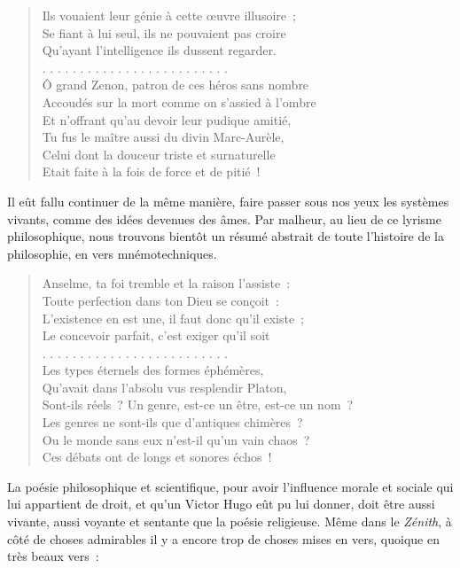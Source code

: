 \documentclass[french,twoside]{book} %
\begin{document}
\begin{verse}
Ils vouaient leur génie à cette œuvre illusoire ;\\
Se fiant à lui seul, ils ne pouvaient pas croire\\
Qu’ayant l’intelligence ils dussent regarder.\\
. . . . . . . . . . . . . . . . . . . . . . . . .\\
Ô grand Zenon, patron de ces héros sans nombre\\
Accoudés sur la mort comme on s’assied à l’ombre\\
Et n’offrant qu’au devoir leur pudique amitié,\\
Tu fus le maître aussi du divin Marc-Aurèle,\\
Celui dont la douceur triste et surnaturelle\\
Etait faite à la fois de force et de pitié !\\
\end{verse}

\noindent Il eût fallu continuer de la même manière, faire passer sous nos yeux les systèmes vivants, comme des idées devenues des âmes. Par malheur, au lieu de ce lyrisme philosophique, nous trouvons bientôt un résumé abstrait de toute l’histoire de la philosophie, en vers mnémotechniques.\par


\begin{verse}
Anselme, ta foi tremble et la raison l’assiste :\\
Toute perfection dans ton Dieu se conçoit :\\
L’existence en est une, il faut donc qu’il existe ;\\
Le concevoir parfait, c’est exiger qu’il soit\\
. . . . . . . . . . . . . . . . . . . . . . . . .\\
Les types éternels des formes éphémères,\\
Qu’avait dans l’absolu vus resplendir Platon,\\
Sont-ils réels ? Un genre, est-ce un être, est-ce un nom ?\\
Les genres ne sont-ils que d’antiques chimères ?\\
Ou le monde sans eux n’est-il qu’un vain chaos ?\\
Ces débats ont de longs et sonores échos !\\
\end{verse}

\noindent La poésie philosophique et scientifique, pour avoir l’influence morale et sociale qui lui appartient de droit, et qu’un Victor Hugo eût pu lui donner, doit être aussi vivante, aussi voyante et sentante que la poésie religieuse. Même dans le \emph{Zénith}, à côté de choses admirables il y a encore trop de choses mises en vers, quoique en très beaux vers :\par
\end{document}
